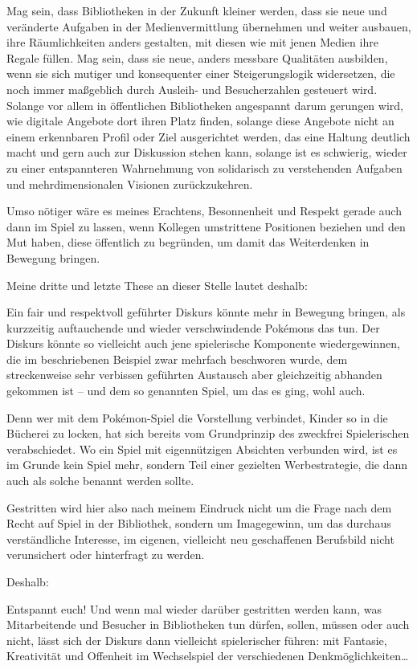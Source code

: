\documentclass[a4paper,
fontsize=11pt,
oneside,
numbers=noperiodatend,
parskip=half-,
bibliography=totoc,
final
]{scrartcl}
\begin{document}
Mag sein, dass Bibliotheken in der Zukunft kleiner werden, dass sie neue
und veränderte Aufgaben in der Medienvermittlung übernehmen und weiter
ausbauen, ihre Räumlichkeiten anders gestalten, mit diesen wie mit jenen
Medien ihre Regale füllen. Mag sein, dass sie neue, anders messbare
Qualitäten ausbilden, wenn sie sich mutiger und konsequenter einer
Steigerungslogik widersetzen, die noch immer maßgeblich durch Ausleih-
und Besucherzahlen gesteuert wird. Solange vor allem in öffentlichen
Bibliotheken angespannt darum gerungen wird, wie digitale Angebote dort
ihren Platz finden, solange diese Angebote nicht an einem erkennbaren
Profil oder Ziel ausgerichtet werden, das eine Haltung deutlich macht
und gern auch zur Diskussion stehen kann, solange ist es schwierig,
wieder zu einer entspannteren Wahrnehmung von solidarisch zu
verstehenden Aufgaben und mehrdimensionalen Visionen zurückzukehren.

Umso nötiger wäre es meines Erachtens, Besonnenheit und Respekt gerade
auch dann im Spiel zu lassen, wenn Kollegen umstrittene Positionen
beziehen und den Mut haben, diese öffentlich zu begründen, um damit das
Weiterdenken in Bewegung bringen.

Meine dritte und letzte These an dieser Stelle lautet deshalb:

Ein fair und respektvoll geführter Diskurs könnte mehr in Bewegung
bringen, als kurzzeitig auftauchende und wieder verschwindende Pokémons
das tun. Der Diskurs könnte so vielleicht auch jene spielerische
Komponente wiedergewinnen, die im beschriebenen Beispiel zwar mehrfach
beschworen wurde, dem streckenweise sehr verbissen geführten Austausch
aber gleichzeitig abhanden gekommen ist -- und dem so genannten Spiel,
um das es ging, wohl auch.

Denn wer mit dem Pokémon-Spiel die Vorstellung verbindet, Kinder so in
die Bücherei zu locken, hat sich bereits vom Grundprinzip des zweckfrei
Spielerischen verabschiedet. Wo ein Spiel mit eigennützigen Absichten
verbunden wird, ist es im Grunde kein Spiel mehr, sondern Teil einer
gezielten Werbestrategie, die dann auch als solche benannt werden
sollte.

Gestritten wird hier also nach meinem Eindruck nicht um die Frage nach
dem Recht auf Spiel in der Bibliothek, sondern um Imagegewinn, um das
durchaus verständliche Interesse, im eigenen, vielleicht neu
geschaffenen Berufsbild nicht verunsichert oder hinterfragt zu werden.

Deshalb:

Entspannt euch! Und wenn mal wieder darüber gestritten werden kann, was
Mitarbeitende und Besucher in Bibliotheken tun dürfen, sollen, müssen
oder auch nicht, lässt sich der Diskurs dann vielleicht spielerischer
führen: mit Fantasie, Kreativität und Offenheit im Wechselspiel der
verschiedenen Denkmöglichkeiten\ldots{}
\end{document}
